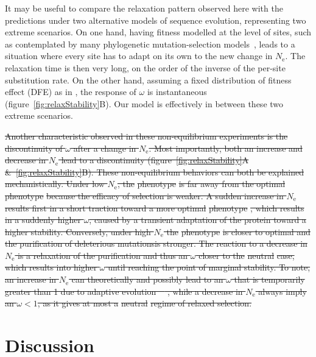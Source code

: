 \documentclass[authoryear]{elsarticle} %
\newcommand{\Ne}{N_{\text{e}}} %
\providecommand{\DIFdeltex}[1]{{\protect\color{red}\sout{#1}}}                      %
\providecommand{\DIFdelbegin}{} %
\providecommand{\DIFdelend}{} %
\providecommand{\DIFdel}[1]{\texorpdfstring{\DIFdeltex{#1}}{}} %
\begin{document}
It may be useful to compare the relaxation pattern observed here with the predictions under two alternative models of sequence evolution, representing two extreme scenarios.
On one hand, having fitness modelled at the level of sites, such as contemplated by many phylogenetic mutation-selection models~\citep{Halpern1998, Rodrigue2010, Tamuri2012}, leads to a situation where every site has to adapt on its own to the new change in $\Ne$.
The relaxation time is then very long, on the order of the inverse of the per-site {substitution} rate.
On the other hand, assuming a fixed distribution of fitness effect ({DFE}) as in \citet{Welch2008}, the response of $\omega$ is instantaneous (figure~\ref{fig:relaxStability}B).
Our model is effectively in between these two extreme scenarios.

\DIFdelbegin \DIFdel{Another characteristic observed in these non-equilibrium experiments is the discontinuity of $\omega$ after a change in $\Ne$.
Most importantly, both an increase and decrease in $\Ne$ lead to a discontinuity (figure~\ref{fig:relaxStability}A \&~\ref{fig:relaxStability}B).
These non-equilibrium behaviors can both be explained mechanistically.
Under low $\Ne$, the }%
\DIFdel{phenotype}%
\DIFdel{is far away from the optimal }%
\DIFdel{phenotype}%
\DIFdel{because the efficacy of selection is weaker.
A sudden increase in $\Ne$ results first in a short traction toward a more optimal }%
\DIFdel{phenotype }%
\DIFdel{, which results in a suddenly higher $\omega$, caused by a transient adaptation of the protein toward a higher stability.
Conversely, under high $\Ne$ the }%
\DIFdel{phenotype }%
\DIFdel{is closer to optimal and the purification of deleterious mutationsis stronger.
The reaction to a decrease in $\Ne$ is a relaxation of the purification and thus an $\omega$ closer to the }%
\DIFdel{neutral}%
\DIFdel{case, which results into higher $\omega$ until reaching the point of marginal stability.
To note, an increase in $\Ne$ can theoretically and possibly lead to an $\omega$ that is temporarily greater than 1 due to adaptive evolution~\mbox{%
\citep{Jones2016}}\hspace{0pt}%
, while a decrease in $\Ne$ always imply an $\omega < 1$, as it gives at most a }%
\DIFdel{neutral}%
\DIFdel{regime of relaxed selection.
}%

\DIFdelend \section{Discussion}
\DIFdelbegin %
\end{document}
